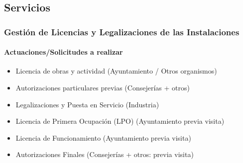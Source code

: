 \subsection{Servicios}
\subsubsection{Gestión de Licencias y Legalizaciones de las Instalaciones}
\paragraph{Actuaciones/Solicitudes a realizar}
\begin{itemize}
    \item Licencia de obras y actividad (Ayuntamiento / Otros organismos)
    \item Autorizaciones particulares previas (Consejerías + otros)
    \item Legalizaciones y Puesta en Servicio (Industria)
    \item Licencia de Primera Ocupación (LPO) (Ayuntamiento previa visita)
    \item Licencia de Funcionamiento (Ayuntamiento previa visita)
    \item Autorizaciones Finales (Consejerías + otros: previa visita)
\end{itemize}

